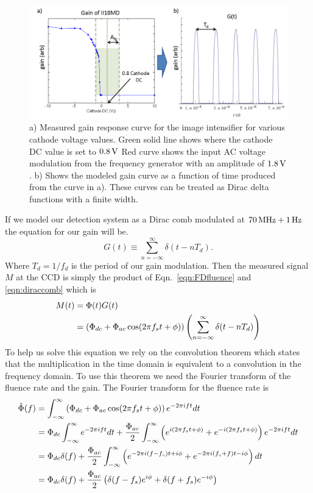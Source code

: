\begin{figure}[h]
\begin{center}
\includegraphics[width=14cm]{./figures/4_Gen3/iigain.png}
\caption{a) Measured gain response curve for the image intensifier for various cathode voltage values. Green solid line shows where the cathode DC value is set to $0.8\,\rm{V}$ Red curve shows the input AC voltage modulation from the frequency generator with an amplitude of $1.8\,\rm{V}$. b) Shows the modeled gain curve as a function of time produced from the curve in a). These curves can be treated as Dirac delta functions with a finite width.}
\label{fig:iigain}
\end{center}
\end{figure}
\noindent
If we model our detection system as a Dirac comb modulated at $70\,\rm{MHz} + 1\,\rm{Hz}$ the equation for our gain will be.
\begin{equation}
\label{eqn:diraccomb}
G(t)\equiv\sum_{n=-\infty}^{\infty} \delta(t - nT_d).
\end{equation}
\noindent
Where $T_d=1/f_d$ is the period of our gain modulation. Then the measured signal $M$ at the CCD is simply the product of Eqn.~\ref{eqn:FDfluence} and \ref{eqn:diraccomb} which is
\begin{align}
M(t)
&=\Phi(t)G(t) \notag \\
&=\left(\Phi_{dc} + \Phi_{ac} \cos(2 \pi f_s t+\phi)\right)\left( \sum_{n=-\infty}^{\infty}\delta(t-n T_d)\right)
\end{align}
\noindent
To help us solve this equation we rely on the convolution theorem which states that the multiplication in the time domain is equivalent to a convolution in the frequency domain. To use this theorem we need the Fourier transform of the fluence rate and the gain. The Fourier transform for the fluence rate is
\begin{align}
\label{eqn:srcFT}
\hat{\Phi}(f)
&=\int_{-\infty}^{\infty} \left(\Phi_{dc}+\Phi_{ac} \cos(2 \pi f_s t+\phi)\right) e^{- 2 \pi i f t} dt \notag \\
&=\Phi_{dc} \int_{-\infty}^{\infty} e^{- 2 \pi i f t} dt + \frac{\Phi_{ac}}{2} \int_{-\infty}^{\infty} \left( e^{i(2 \pi f_s t+\phi)} + e^{-i(2 \pi f_s t+\phi)}\right) e^{-2 \pi i f t} dt \notag \\
&=\Phi_{dc} \delta(f) + \frac{\Phi_{ac}}{2} \int_{-\infty}^{\infty} \left(e^{-2 \pi i(f-f_s)t+i\phi}+e^{-2 \pi i (f_s+f)t-i\phi}\right) dt \notag \\
&=\Phi_{dc} \delta(f) + \frac{\Phi_{ac}}{2} \left( \delta(f-f_s)e^{i\phi}+\delta(f+f_s)e^{-i\phi}\right)
\end{align}
